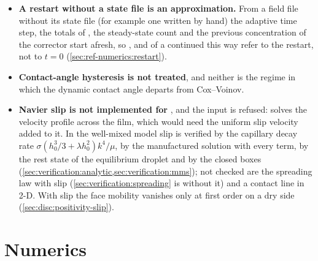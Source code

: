 \begin{itemize}
    well-mixed model's; the profile that evaporation, diffusion with $D(c)$ and
    the vertical advection of the $\zeta$ mapping shape together on a drying
    flat film, against an independent solution (). What is not
    checked is such a profile on a film that is not flat, where the in-plane
    flow and the mapping act together.
  \item \textbf{A restart without a state file is an approximation.} From a
    field file without its state file (for example one written by hand) the
    adaptive
    time step, the totals of , the steady-state count and
    the previous concentration of the  corrector start afresh, so
    ,  and  of a
     continued this way refer to the restart, not to
    $t = 0$ (\cref{sec:ref-numerics:restart}).
  \item \textbf{Contact-angle hysteresis is not treated}, and neither is the
    regime in which the dynamic contact angle departs from Cox--Voinov.
  \item \textbf{Navier slip is not implemented for }, and the input
    is refused:  solves the velocity profile across the film, which
    would need the uniform slip velocity added to it. In the well-mixed model
    slip is verified by the capillary decay rate
    $\sigma(h_0^{3}/3 + \lambda h_0^{2})k^{4}/\mu$, by the manufactured
    solution with every term, by the rest state of the equilibrium droplet and
    by the closed boxes (\cref{sec:verification:analytic,sec:verification:mms});
    not checked are the spreading law with slip
    (\cref{sec:verification:spreading} is without it) and a contact line in
    2-D. With slip the face mobility vanishes only at first order on a dry
    side (\cref{sec:disc:positivity-slip}).
\end{itemize}

\section{Numerics}
\label{sec:notverified:numerics}

